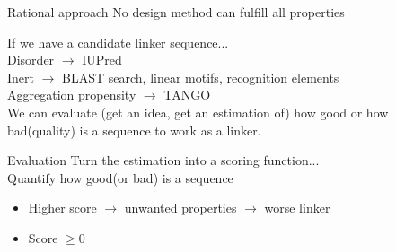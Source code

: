 \documentclass{beamer}
\begin{document}
\begin{frame}{Rational approach}
No design method can fulfill all properties

If we have a candidate linker sequence...\\
Disorder $\rightarrow$  IUPred \\
Inert $\rightarrow$ BLAST search, linear motifs, recognition elements\\
Aggregation propensity $\rightarrow$ TANGO\\

We can evaluate (get an idea, get an estimation of) how good or how bad(quality) is a sequence to work as a linker.


% 
% 
\end{frame}



\begin{frame}{Evaluation}
Turn the estimation into a scoring function...\\
Quantify how good(or bad) is a sequence
\pause
\begin{itemize}
  \item Higher score $\rightarrow$ unwanted properties $\rightarrow$ worse linker
  \item Score $\geqslant 0$ 
\end{itemize}

\end{frame}
\end{document}
